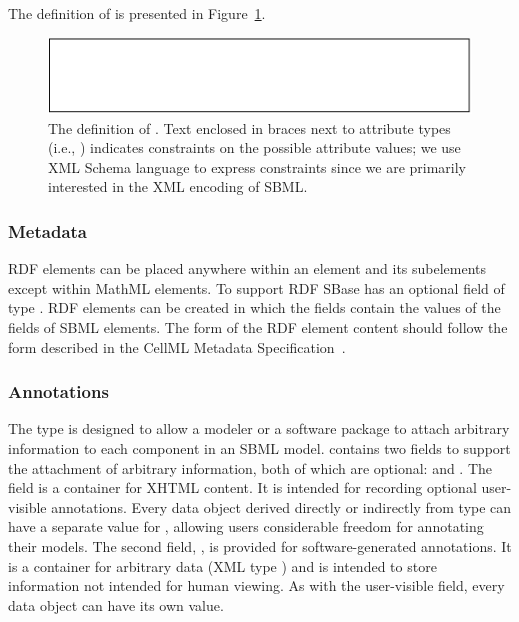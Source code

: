 \documentclass[10pt]{cekarticle}
\newcommand{\vref}[1]{\ref{#1}}
\begin{document}
The definition of  is presented in
Figure~\vref{fig:identified}.

\begin{figure}[h]
  \centering
  \includegraphics[scale = 0.68]{identified}
  \caption{The definition of .  Text enclosed in braces next
    to attribute types (i.e., ) indicates
    constraints on the possible attribute values; we use XML Schema
    language to express constraints since we are primarily interested in
    the XML encoding of SBML.}
  \label{fig:identified}
\end{figure}

\subsubsection{Metadata}
\label{sec:metadata}

RDF elements can be placed anywhere within an  element and its subelements except within MathML elements. To support RDF SBase has an optional field  of type . RDF  elements can be created in which the
 fields contain the values of the
 fields of SBML elements. The form of the RDF
element content should follow the form described in the CellML
Metadata Specification~\citep{cuellar:2002}.

\subsubsection{Annotations}

The type  is designed to allow a modeler or a
software package to attach arbitrary information to each component
in an SBML model.   contains two fields to support
the attachment of arbitrary information, both of which are
optional:  and . The field
 is a container for XHTML content.  It is intended
for recording optional user-visible annotations.  Every data
object derived directly or indirectly from type  can
have a separate value for , allowing users
considerable freedom for annotating their models.  The second
field, , is provided for software-generated
annotations.  It is a container for arbitrary data (XML type
) and is intended to store information not intended for
human viewing.  As with the user-visible  field,
every data object can have its own  value.
\end{document}
